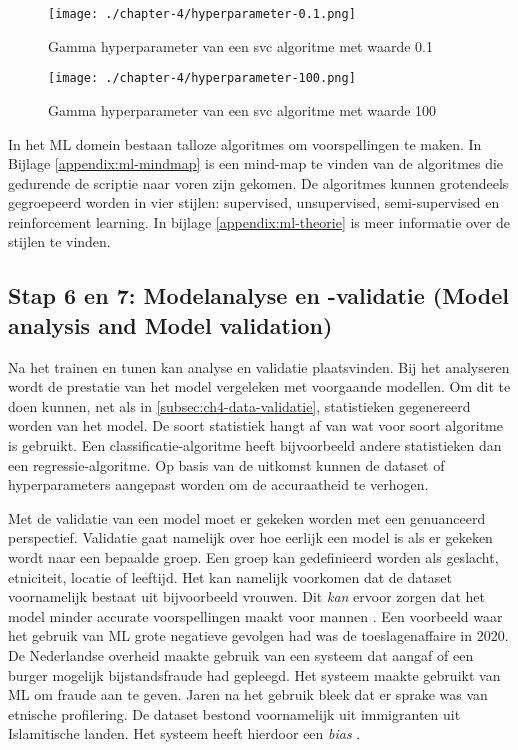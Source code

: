 \begin{figure}[hbt!]
  \centering
  \begin{minipage}{0.45\textwidth}
      \centering
      \texttt{[image: ./chapter-4/hyperparameter-0.1.png]}
      \caption{Gamma hyperparameter van een \acrfull{svc} algoritme met waarde 0.1}
      \label{fig:ch4-hyperparameter-example-0.1}
  \end{minipage}\hfill
  \begin{minipage}{0.45\textwidth}
      \centering
      \texttt{[image: ./chapter-4/hyperparameter-100.png]}
      \caption{Gamma hyperparameter van een \acrfull{svc} algoritme met waarde 100}
      \label{fig:ch4-hyperparameter-example-100}
  \end{minipage}
\end{figure}

In het ML domein bestaan talloze algoritmes om voorspellingen te maken. In Bijlage \ref{appendix:ml-mindmap} is een mind-map te vinden van de algoritmes die gedurende de scriptie naar voren zijn gekomen. De algoritmes kunnen grotendeels gegroepeerd worden in vier stijlen: supervised, unsupervised, semi-supervised en reinforcement learning. In bijlage \ref{appendix:ml-theorie} is meer informatie over de stijlen te vinden.

\subsection{Stap 6 en 7: Modelanalyse en -validatie (Model analysis and Model validation)}\label{subsec:ch4-model-analyse-en-validatie}
Na het trainen en tunen kan analyse en validatie plaatsvinden. Bij het analyseren wordt de prestatie van het model vergeleken met voorgaande modellen. Om dit te doen kunnen, net als in \autoref{subsec:ch4-data-validatie}, statistieken gegenereerd worden van het model. De soort statistiek hangt af van wat voor soort algoritme is gebruikt. Een classificatie-algoritme heeft bijvoorbeeld andere statistieken dan een regressie-algoritme. Op basis van de uitkomst kunnen de dataset of hyperparameters aangepast worden om de accuraatheid te verhogen.

Met de validatie van een model moet er gekeken worden met een genuanceerd perspectief. Validatie gaat namelijk over hoe eerlijk een model is als er gekeken wordt naar een bepaalde groep. Een groep kan gedefinieerd worden als geslacht, etniciteit, locatie of leeftijd. Het kan namelijk voorkomen dat de dataset voornamelijk bestaat uit bijvoorbeeld vrouwen. Dit \textit{kan} ervoor zorgen dat het model minder accurate voorspellingen maakt voor mannen \cite[p.~109-110]{introduction-to-machine-learning}. Een voorbeeld waar het gebruik van ML grote negatieve gevolgen had was de toeslagenaffaire in 2020. De Nederlandse overheid maakte gebruik van een systeem dat aangaf of een burger mogelijk bijstandsfraude had gepleegd. Het systeem maakte gebruikt van ML om fraude aan te geven. Jaren na het gebruik bleek dat er sprake was van etnische profilering. De dataset bestond voornamelijk uit immigranten uit Islamitische landen. Het systeem heeft hierdoor een \textit{bias} \cite{ml-fairness-dutch-syri}.

